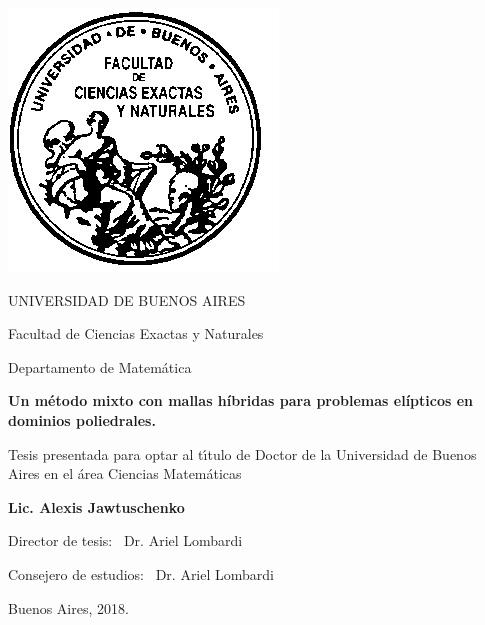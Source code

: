 \documentclass[12pt,a4paper,openany,oneside]{book}
\begin{document}
\thispagestyle{empty}

\begin {center}

\includegraphics[scale=.3]{logofac.jpg}

\medskip
UNIVERSIDAD DE BUENOS AIRES

Facultad de Ciencias Exactas y Naturales

Departamento de Matem\'atica

\vspace{3cm}

\textbf{\large Un m\'etodo mixto con mallas h\'ibridas para problemas el\'ipticos
en dominios poliedrales.}

\vspace{2cm}

Tesis presentada para optar al t\'\i tulo de Doctor de la Universidad de Buenos Aires en el \'area Ciencias Matem\'aticas

\vspace{2cm}

\textbf{Lic. Alexis Jawtuschenko}

\end {center}

\vspace{1.5cm}

\noindent Director de tesis: \ Dr. Ariel Lombardi

\noindent Consejero de estudios: \ Dr. Ariel Lombardi

\vspace{1cm}

\noindent Buenos Aires, 2018.
\newpage
\end{document}
